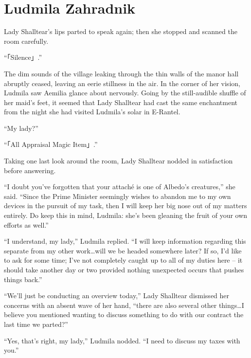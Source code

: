 \chapter{Ludmila Zahradnik}

Lady Shalltear’s lips parted to speak again; then she stopped and scanned the room carefully.

 

“「Silence」.”

 

The dim sounds of the village leaking through the thin walls of the manor hall abruptly ceased, leaving an eerie stillness in the air. In the corner of her vision, Ludmila saw Aemilia glance about nervously. Going by the still-audible shuffle of her maid’s feet, it seemed that Lady Shalltear had cast the same enchantment from the night she had visited Ludmila’s solar in E-Rantel.

 

“My lady?”

 

“「All Appraisal Magic Item」.”

 

Taking one last look around the room, Lady Shalltear nodded in satisfaction before answering.

 

“I doubt you’ve forgotten that your attaché is one of Albedo’s creatures,” she said. “Since the Prime Minister seemingly wishes to abandon me to my own devices in the pursuit of my task, then I will keep her big nose out of my matters entirely. Do keep this in mind, Ludmila: she’s been gleaning the fruit of your own efforts as well.”

 

“I understand, my lady,” Ludmila replied. “I will keep information regarding this separate from my other work…will we be headed somewhere later? If so, I’d like to ask for some time; I’ve not completely caught up to all of my duties here – it should take another day or two provided nothing unexpected occurs that pushes things back.”

 

“We’ll just be conducting an overview today,” Lady Shalltear dismissed her concerns with an absent wave of her hand, “there are also several other things…I believe you mentioned wanting to discuss something to do with our contract the last time we parted?”

 

“Yes, that’s right, my lady,” Ludmila nodded. “I need to discuss my taxes with you.”

